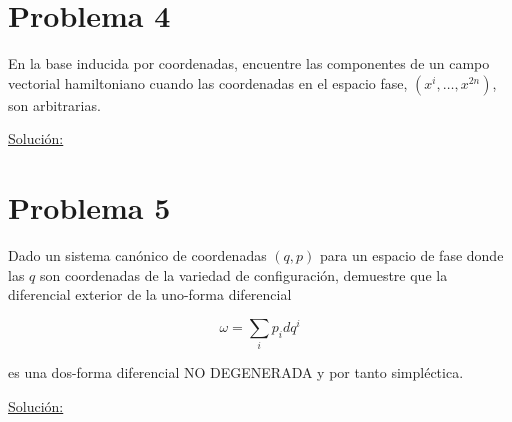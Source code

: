 \documentclass[a4paper,10pt]{article}
\numberwithin{equation}{section}
\begin{document}
\section{Problema 4}

En la base inducida por coordenadas, encuentre las componentes de un campo vectorial 
hamiltoniano cuando las coordenadas en el espacio fase, $(x^i,\dots,x^{2n})$, son 
arbitrarias.

\vspace{.3cm}

\underline{Solución:} \vspace{.3cm}

\section{Problema 5}

Dado un sistema canónico de coordenadas $(q,p)$ para un espacio de fase donde las $q$ 
son coordenadas de la variedad de configuración, demuestre que la diferencial exterior 
de la uno-forma diferencial 

$$
\omega = \sum_i p_idq^i
$$

es una dos-forma diferencial NO DEGENERADA y por tanto simpléctica.

\vspace{.3cm}

\underline{Solución:} \vspace{.3cm}
\end{document}
